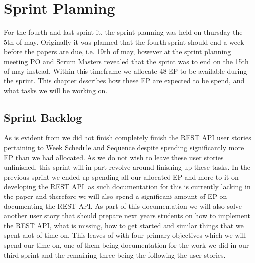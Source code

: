 \chapter{Sprint Planning}\label{chap:Planning4}
For the fourth and last sprint it, the sprint planning was held on thursday the 5th of may.
Originally it was planned that the fourth sprint should end a week before the papers are due, i.e. 19th of may, however at the sprint planning meeting PO and Scrum Masters revealed that the sprint was to end on the 15th of may instead.
Within this timeframe we allocate 48 EP to be available during the sprint.
This chapter describes how these EP are expected to be spend, and what tasks we will be working on.

\section{Sprint Backlog}
As is evident from  we did not finish completely finish the REST API user stories pertaining to Week Schedule and Sequence despite spending significantly more EP than we had allocated.
As we do not wish to leave these user stories unfinished, this sprint will in part revolve around finishing up these tasks.
In the previous sprint we ended up spending all our allocated EP and more to it on developing the REST API, as such documentation for this is currently lacking in the paper and therefore we will also spend a significant amount of EP on documenting the REST API.
As part of this documentation we will also solve another user story that should prepare next years students on how to implement the REST API, what is missing, how to get started and similar things that we spent alot of time on.
This leaves of with four primary objectives which we will spend our time on, one of them being documentation for the work we did in our third sprint and the remaining three being the following the user stories.

\bigskip \noindent
{}

\medskip \noindent
{}

\medskip \noindent
{}

